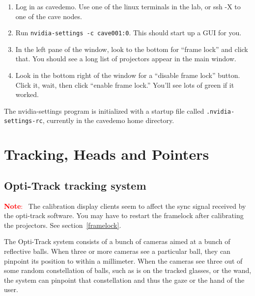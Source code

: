 \documentclass[11pt]{article}
\newenvironment{note}[1][Note]{\begin{lrbox}{\notebox}%
    \begin{minipage}{0.9\columnwidth}\textcolor{red}{\textbf{#1}:~}}%
    {\end{minipage}\end{lrbox}\begin{center}\setlength{\fboxsep}{8pt}%
    \fbox{\usebox{\notebox}}\end{center}}
\begin{document}
\begin{enumerate}

\item Log in as cavedemo.  Use one of the linux terminals in the lab,
  or ssh -X to one of the cave nodes.

\item Run \texttt{nvidia-settings -c cave001:0}.  This should start up
  a GUI for you.

\item In the left pane of the window, look to the bottom for ``frame
  lock'' and click that.  You should see a long list of projectors
  appear in the main window.

\item Look in the bottom right of the window for a ``disable frame
  lock'' button.  Click it, wait, then click ``enable frame lock.''
  You'll see lots of green if it worked.

\end{enumerate}


The nvidia-settings program is initialized with a startup file called
\texttt{.nvidia-settings-rc}, currently in the cavedemo home directory.



\section{Tracking, Heads and Pointers}

\subsection{Opti-Track tracking system}
\label{opti-track}

\begin{note}
  The calibration display clients seem to affect the sync signal
  received by the opti-track software.  You may have to restart the
  framelock after calibrating the projectors.  See
  section~\ref{framelock}.
\end{note}

The Opti-Track system consists of a bunch of cameras aimed at a bunch
of reflective balls.  When three or more cameras see a particular
ball, they can pinpoint its position to within a millimeter.  When the
cameras see three out of some random constellation of balls, such as
is on the tracked glasses, or the wand, the system can pinpoint that
constellation and thus the gaze or the hand of the user.
\end{document}
